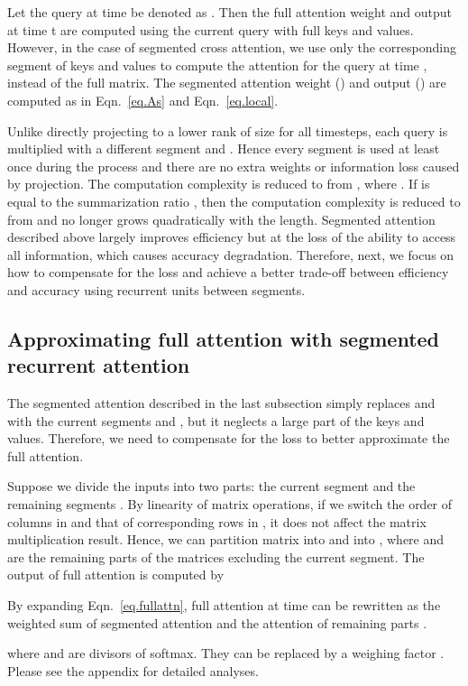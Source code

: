 \documentclass[11pt]{article}
\begin{document}
Let the query at time  be denoted as . Then the full attention weight  and output  at time t are computed using the current query  with full keys and values. However, in the case of segmented cross attention, we use only the corresponding segment of keys and values to compute the attention for the query at time , instead of the full matrix. The segmented attention weight () and output () are computed as in Eqn.~\ref{eq.As} and Eqn.~\ref{eq.local}.

Unlike directly projecting  to a lower rank of size  for all timesteps, each query is multiplied with a different segment  and . Hence every segment is used at least once during the process and there are no extra weights or information loss caused by projection. The computation complexity is reduced to  from , where . If  is equal to the summarization ratio , then the computation complexity is reduced to  from  and no longer grows quadratically with the length. Segmented attention described above largely improves efficiency but at the loss of the ability to access all information, which causes accuracy degradation. Therefore, next, we focus on how to compensate for the loss and achieve a better trade-off between efficiency and accuracy using recurrent units between segments. 


\subsection{Approximating full attention with segmented recurrent attention}
The segmented attention described in the last subsection simply replaces  and  with the current segments  and , but it neglects a large part of the keys and values. Therefore, we need to compensate for the loss to better approximate the full attention. 

Suppose we divide the inputs into two parts: the current segment  and the remaining segments . By linearity of matrix operations, if we switch the order of columns in  and that of corresponding rows in , it does not affect the matrix multiplication result. Hence, we can partition matrix  into  and  into , where  and  are the remaining parts of the matrices excluding the current segment. The output  of full attention is computed by

By expanding Eqn.~\ref{eq.fullattn}, full attention at time  can be rewritten as the weighted sum of segmented attention  and the attention of remaining parts .
 
where  and  are divisors of softmax. They can be replaced by a weighing factor . Please see the appendix for detailed analyses.
\end{document}
